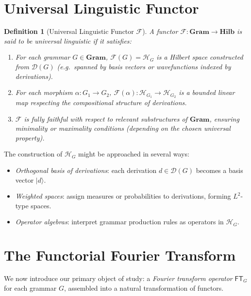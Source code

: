 \documentclass[11pt]{article}
\newtheorem{definition}{Definition}[section]
\begin{document}
\section{Universal Linguistic Functor}

\begin{definition}[Universal Linguistic Functor \(\mathcal{F}\)]
A functor \(\mathcal{F}: \mathbf{Gram} \to \mathbf{Hilb}\) is said to be \emph{universal linguistic} if it satisfies:
\begin{enumerate}
    \item For each grammar \(G\in\mathbf{Gram}\), \(\mathcal{F}(G) = \mathcal{H}_G\) is a Hilbert space constructed from \(\mathcal{D}(G)\) (e.g.\ spanned by basis vectors or wavefunctions indexed by derivations).
    \item For each morphism \(\alpha: G_1 \to G_2\), \(\mathcal{F}(\alpha) : \mathcal{H}_{G_1} \to \mathcal{H}_{G_2}\) is a bounded linear map respecting the compositional structure of derivations.
    \item \(\mathcal{F}\) is \emph{fully faithful} with respect to relevant substructures of \(\mathbf{Gram}\), ensuring minimality or maximality conditions (depending on the chosen universal property).
\end{enumerate}
\end{definition}

The construction of \(\mathcal{H}_G\) might be approached in several ways:
\begin{itemize}
    \item \emph{Orthogonal basis of derivations}: each derivation \(d \in \mathcal{D}(G)\) becomes a basis vector \(\lvert d \rangle\).
    \item \emph{Weighted spaces}: assign measures or probabilities to derivations, forming \(L^2\)-type spaces.
    \item \emph{Operator algebras}: interpret grammar production rules as operators in \(\mathcal{H}_G\).
\end{itemize}

\section{The Functorial Fourier Transform}

We now introduce our primary object of study: a \emph{Fourier transform operator} \(\mathsf{FT}_G\) for each grammar \(G\), assembled into a natural transformation of functors. 
\end{document}
